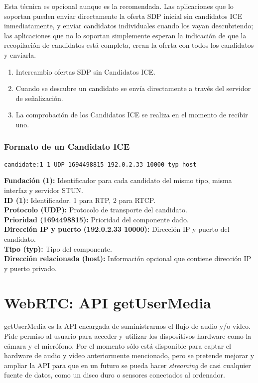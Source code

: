 Esta técnica es opcional aunque es la recomendada. Las aplicaciones que lo soportan pueden enviar directamente la oferta SDP inicial sin candidatos ICE inmediatamente, y enviar candidatos individuales cuando los vayan descubriendo; las aplicaciones que no lo soportan simplemente esperan la indicación de que la recopilación de candidatos está completa, crean la oferta con todos los candidatos y enviarla.\\

\begin{enumerate}
\item Intercambio ofertas SDP sin Candidatos ICE.
\item Cuando se descubre un candidato se envía directamente a través del servidor de señalización.
\item La comprobación de los Candidatos ICE se realiza en el momento de recibir uno.
\end{enumerate}

\subsubsection{Formato de un Candidato ICE}

\begin{lstlisting}[caption=Ejemplo paquete SDP]
candidate:1 1 UDP 1694498815 192.0.2.33 10000 typ host
\end{lstlisting}

\noindent \textbf{Fundación (1):} Identificador para cada candidato del mismo tipo, misma interfaz y servidor STUN.\\
\textbf{ID (1):} Identificador. 1 para RTP, 2 para RTCP.\\
\textbf{Protocolo (UDP):} Protocolo de transporte del candidato.\\
\textbf{Prioridad (1694498815): }Prioridad del componente dado.\\
\textbf{Dirección IP y puerto (192.0.2.33 10000): }Dirección IP y puerto del candidato.\\
\textbf{Tipo (typ):} Tipo del componente.\\
\textbf{Dirección relacionada (host):} Información opcional que contiene dirección IP y puerto privado.\\


\section{WebRTC: API getUserMedia} 

getUserMedia es la API encargada de suministrarnos el flujo de audio y/o vídeo. Pide permiso al usuario para acceder y utilizar los dispositivos hardware como la cámara y el micrófono. Por el momento sólo está disponible para captar el hardware de audio y vídeo anteriormente mencionado, pero se pretende mejorar y ampliar la API para que en un futuro se pueda hacer \emph{streaming} de casi cualquier fuente de datos, como un disco duro o sensores conectados al ordenador.\\

